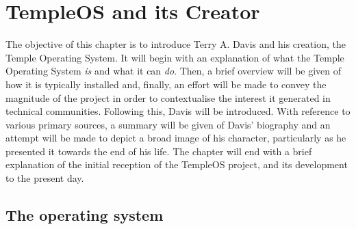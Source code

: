 \documentclass[Draft.tex]{subfiles}
\begin{document}
\chapter{TempleOS and its Creator}

The objective of this chapter is to introduce Terry A. Davis
and his creation, the Temple Operating System.
It will begin with an explanation of what the Temple Operating System
\textit{is} and what it can \textit{do}.
Then, a brief overview will be given of how it is typically installed
and, finally, an effort will be made to convey
the magnitude of the project in order to contextualise
the interest it generated in technical communities.
Following this, Davis will be introduced.
With reference to various primary sources,
a summary will be given of Davis' biography and
an attempt will be made to depict a broad image of his character,
particularly as he presented it towards the end of his life.
The chapter will end with a brief explanation of the initial reception of
the TempleOS project, and its development to the present day.

\section*{The operating system}
\end{document}
